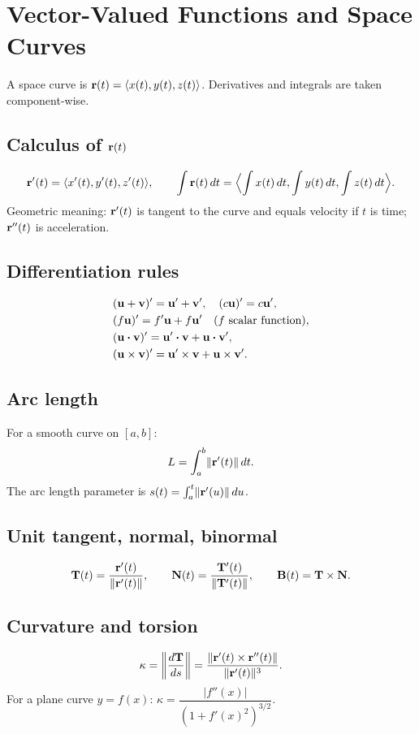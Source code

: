 \section{Vector-Valued Functions and Space Curves}

A space curve is $\mathbf{r}(t) = \langle x(t), y(t), z(t) \rangle$.
Derivatives and integrals are taken component-wise.

\subsection{Calculus of $\mathbf{r}(t)$}
\[
\mathbf{r}'(t) = \langle x'(t), y'(t), z'(t) \rangle, \qquad
\int \mathbf{r}(t) \,dt = \Bigl\langle \int x(t) \,dt, \int y(t) \,dt, \int z(t) \,dt \Bigr\rangle.
\]
Geometric meaning: $\mathbf{r}'(t)$ is tangent to the curve and equals velocity if $t$ is time;
$\mathbf{r}''(t)$ is acceleration.

\subsection{Differentiation rules}
\[
\begin{aligned}
&(\mathbf{u} + \mathbf{v})' = \mathbf{u}' + \mathbf{v}', \quad (c \mathbf{u})' = c \mathbf{u}',\\
&(f \mathbf{u})' = f' \mathbf{u} + f \mathbf{u}' \quad (f \text{ scalar function}), \\
&(\mathbf{u} \boldsymbol\cdot \mathbf{v})' = \mathbf{u}' \boldsymbol\cdot \mathbf{v} + \mathbf{u} \boldsymbol\cdot \mathbf{v}', \\
&(\mathbf{u} \times \mathbf{v})' = \mathbf{u}' \times \mathbf{v} + \mathbf{u} \times \mathbf{v}'.
\end{aligned}
\]

\subsection{Arc length}
For a smooth curve on $[a,b]$:
\[ L = \int_a^b \lVert \mathbf{r}'(t) \rVert \,dt. \]
The arc length parameter is $s(t) = \int_a^t \lVert \mathbf{r}'(u) \rVert \,du$.

\subsection{Unit tangent, normal, binormal}
\[
\mathbf{T}(t) = \frac{\mathbf{r}'(t)}{\lVert \mathbf{r}'(t) \rVert}, \qquad
\mathbf{N}(t) = \frac{\mathbf{T}'(t)}{\lVert \mathbf{T}'(t) \rVert}, \qquad
\mathbf{B}(t) = \mathbf{T} \times \mathbf{N}.
\]

\subsection{Curvature and torsion}
\[
\kappa = \left\lVert \frac{d\mathbf{T}}{ds} \right\rVert
= \frac{\lVert \mathbf{r}'(t) \times \mathbf{r}''(t) \rVert}{\lVert \mathbf{r}'(t) \rVert^3}.
\]
For a plane curve $y = f(x)$: $\kappa = \dfrac{|f''(x)|}{(1 + f'(x)^2)^{3/2}}$.

